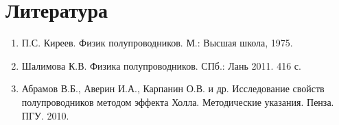 \section{Литература}
\begin{enumerate}
\item П.С. Киреев. Физик полупроводников. М.: Высшая школа, 1975.
\item Шалимова К.В. Физика полупроводников. СПб.: Лань 2011. 416 с.
\item Абрамов В.Б., Аверин И.А., Карпанин О.В. и др. Исследование свойств полупроводников методом эффекта Холла. Методические указания. Пенза. ПГУ. 2010.
\end{enumerate}